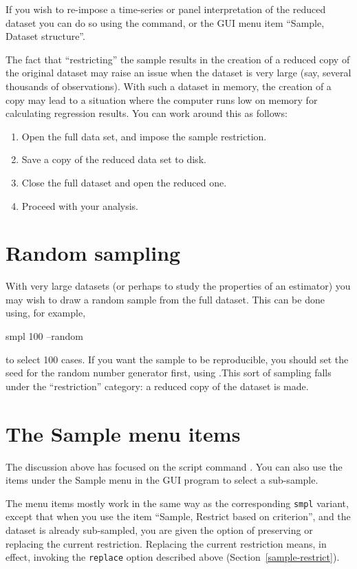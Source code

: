 If you wish to re-impose a time-series or panel interpretation of the
reduced dataset you can do so using the  command, or the
GUI menu item ``Sample, Dataset structure''.

The fact that ``restricting'' the sample results in the creation of a
reduced copy of the original dataset may raise an issue when the
dataset is very large (say, several thousands of observations).  With
such a dataset in memory, the creation of a copy may lead to a
situation where the computer runs low on memory for calculating
regression results.  You can work around this as follows:

\begin{enumerate}
\item Open the full data set, and impose the sample restriction.
\item Save a copy of the reduced data set to disk.
\item Close the full dataset and open the reduced one.
\item Proceed with your analysis.
\end{enumerate}

\section{Random sampling}
\label{sample-random}

With very large datasets (or perhaps to study the properties of an
estimator) you may wish to draw a random sample from the full dataset.
This can be done using, for example,
%
\begin{code}
    smpl 100 --random
\end{code}
%
to select 100 cases.  If you want the sample to be reproducible, you
should set the seed for the random number generator first, using
.This sort of sampling falls under the ``restriction''
category: a reduced copy of the dataset is made.

\section{The Sample menu items}
\label{sample-menu}

The discussion above has focused on the script command . You
can also use the items under the \textsf{Sample} menu in the GUI
program to select a sub-sample.

The menu items mostly work in the same way as the corresponding
\verb+smpl+ variant, except that when you use the item ``Sample,
Restrict based on criterion'', and the dataset is already sub-sampled,
you are given the option of preserving or replacing the current
restriction.  Replacing the current restriction means, in effect,
invoking the \verb+replace+ option described above
(Section~\ref{sample-restrict}).
    

